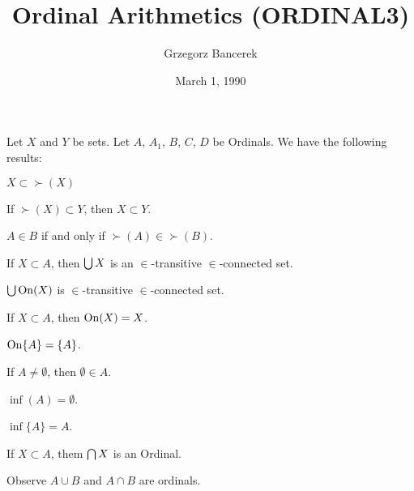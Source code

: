\documentclass{article}
\title{Ordinal Arithmetics (ORDINAL3)}
\author{Grzegorz Bancerek}
\date{March 1, 1990}
\begin{document}
\maketitle

Let $X$ and $Y$ be sets. Let $A$, $A_{1}$, $B$, $C$, $D$ be
Ordinals. We have the following results:
\begin{thm}
\item\label{ordinal3:1} $X\subset\succ(X)$
\item\label{ordinal3:2} If $\succ(X)\subset Y$, then $X\subset Y$.
\item\label{ordinal3:3} $A\in B$ if and only if $\succ(A)\in\succ(B)$.
\item\label{ordinal3:4} If $X\subset A$, then $\bigcup X$ is
  an $\in$-transitive $\in$-connected set.
\item\label{ordinal3:5} $\bigcup\operatorname{On}(X)$ is $\in$-transitive
  $\in$-connected set.
\item\label{ordinal3:6} If $X\subset A$, then $\operatorname{On}(X)=X$.
\item\label{ordinal3:7} $\operatorname{On}\{A\}=\{A\}$.
\item\label{ordinal3:8} If $A\neq\emptyset$, then $\emptyset\in A$.
\item\label{ordinal3:9} $\inf(A)=\emptyset$.
\item\label{ordinal3:10} $\inf\{A\}=A$.
\item\label{ordinal3:11} If $X\subset A$, them $\bigcap X$ is an Ordinal.
\end{thm}

Observe $A\cup B$ and $A\cap B$ are ordinals.
\end{document}

